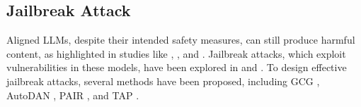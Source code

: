 \subsection{Jailbreak Attack}
Aligned LLMs, despite their intended safety measures, can still produce harmful content, as highlighted in studies like \cite{zhou2023synthetic}, \cite{hazell2023spear}, and \cite{kang2024exploiting}. Jailbreak attacks, which exploit vulnerabilities in these models, have been explored in \cite{wei2024jailbroken} and \cite{carlini2024aligned}. To design effective jailbreak attacks, several methods have been proposed, including GCG \cite{zou2023universal}, AutoDAN \cite{liu2023autodan}, PAIR \cite{chao2023jailbreaking}, and TAP \cite{mehrotra2023tree}. 


